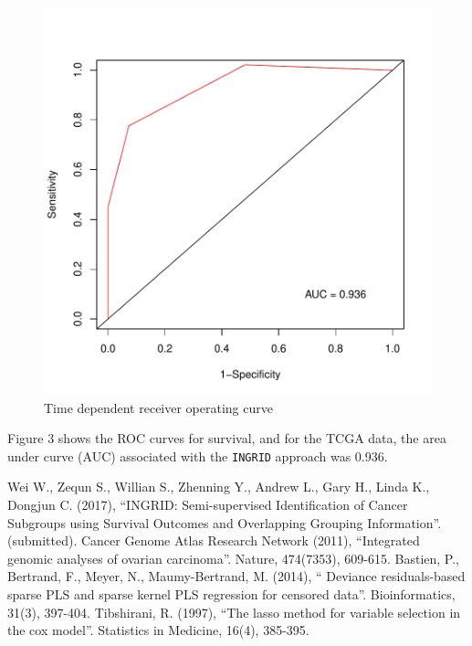 \documentclass[11pt]{article}
\begin{document}
\begin{figure}[tbh]
\begin{center}
\includegraphics{INGRID-example-plot3}
\caption{Time dependent receiver operating curve}
\end{center}
\end{figure}

Figure 3 shows the ROC curves for survival, and for the TCGA data, the area under curve (AUC) associated with the \texttt{INGRID} approach was 0.936.

\begin{thebibliography}{99}
 Wei W., Zequn S., Willian S., Zhenning Y., Andrew L., Gary H., Linda K., Dongjun C. (2017), ``INGRID: Semi-supervised Identification of Cancer Subgroups using Survival Outcomes and Overlapping Grouping Information''. (submitted).
 Cancer Genome Atlas Research Network (2011), ``Integrated genomic analyses of ovarian carcinoma''. Nature, 474(7353), 609-615.
 Bastien, P., Bertrand, F., Meyer, N., Maumy-Bertrand, M. (2014), `` Deviance residuals-based sparse PLS and sparse kernel PLS regression for censored data''. Bioinformatics, 31(3), 397-404.
 Tibshirani, R. (1997), ``The lasso method for variable selection in the cox model''. Statistics in Medicine, 16(4), 385-395.

\end{thebibliography}
\end{document}
